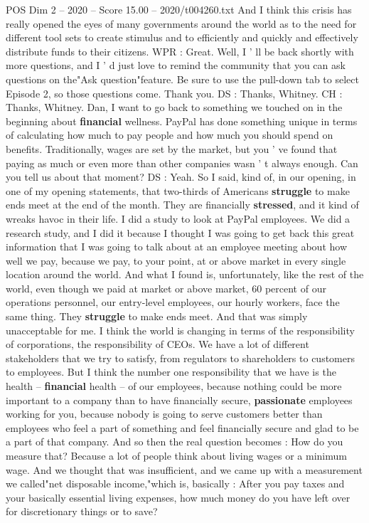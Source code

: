 \begin{textsample}{POS Dim 2 – 2020 – Score 15.00 – 2020/t004260.txt}
And I think this crisis has really opened the eyes of many governments around the world as to the need for different tool sets to create stimulus and to efficiently and quickly and effectively distribute funds to their citizens.
WPR : Great.
Well, I ' ll be back shortly with more questions, and I ' d just love to remind the community that you can ask questions on the"Ask question"feature.
Be sure to use the pull-down tab to select Episode 2, so those questions come.
Thank you.
DS : Thanks, Whitney.
CH : Thanks, Whitney.
Dan, I want to go back to something we touched on in the beginning about \textbf{financial} wellness.
PayPal has done something unique in terms of calculating how much to pay people and how much you should spend on benefits.
Traditionally, wages are set by the market, but you ' ve found that paying as much or even more than other companies wasn ' t always enough.
Can you tell us about that moment?
DS : Yeah.
So I said, kind of, in our opening, in one of my opening statements, that two-thirds of Americans \textbf{struggle} to make ends meet at the end of the month.
They are financially \textbf{stressed}, and it kind of wreaks havoc in their life.
I did a study to look at PayPal employees.
We did a research study, and I did it because I thought I was going to get back this great information that I was going to talk about at an employee meeting about how well we pay, because we pay, to your point, at or above market in every single location around the world.
And what I found is, unfortunately, like the rest of the world, even though we paid at market or above market, 60 percent of our operations personnel, our entry-level employees, our hourly workers, face the same thing.
They \textbf{struggle} to make ends meet.
And that was simply unacceptable for me.
I think the world is changing in terms of the responsibility of corporations, the responsibility of CEOs.
We have a lot of different stakeholders that we try to satisfy, from regulators to shareholders to customers to employees.
But I think the number one responsibility that we have is the health -- \textbf{financial} health -- of our employees, because nothing could be more important to a company than to have financially secure, \textbf{passionate} employees working for you, because nobody is going to serve customers better than employees who feel a part of something and feel financially secure and glad to be a part of that company.
And so then the real question becomes : How do you measure that?
Because a lot of people think about living wages or a minimum wage.
And we thought that was insufficient, and we came up with a measurement we called"net disposable income,"which is, basically : After you pay taxes and your basically essential living expenses, how much money do you have left over for discretionary things or to save?

\end{textsample}
